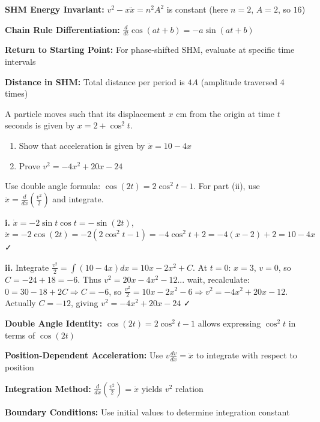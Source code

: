 \begin{takeaways}
\item \textbf{SHM Energy Invariant:} $v^2 - x\ddot{x} = n^2A^2$ is constant (here $n=2$, $A=2$, so $16$)
\item \textbf{Chain Rule Differentiation:} $\frac{d}{dt}\cos(at+b) = -a\sin(at+b)$
\item \textbf{Return to Starting Point:} For phase-shifted SHM, evaluate at specific time intervals
\item \textbf{Distance in SHM:} Total distance per period is $4A$ (amplitude traversed 4 times)
\end{takeaways}

\begin{problem}
A particle moves such that its displacement $x$ cm from the origin at time $t$ seconds is given by $x = 2 + \cos^2 t$.
\begin{enumerate}[label=\textbf{\roman*.}]
    \item Show that acceleration is given by $\ddot{x} = 10 - 4x$
    \item Prove $v^2 = -4x^2 + 20x - 24$
\end{enumerate}
\end{problem}

\begin{hint}
Use double angle formula: $\cos(2t) = 2\cos^2 t - 1$. For part (ii), use $\ddot{x} = \frac{d}{dx}\left(\frac{v^2}{2}\right)$ and integrate.
\end{hint}

\begin{solution}
\textbf{i.} $\dot{x} = -2\sin t\cos t = -\sin(2t)$, $\ddot{x} = -2\cos(2t) = -2(2\cos^2 t - 1) = -4\cos^2 t + 2 = -4(x-2) + 2 = 10 - 4x$ ✓

\textbf{ii.} Integrate $\frac{v^2}{2} = \int(10-4x)dx = 10x - 2x^2 + C$. At $t=0$: $x=3$, $v=0$, so $C = -24 + 18 = -6$. Thus $v^2 = 20x - 4x^2 - 12$... wait, recalculate: $0 = 30 - 18 + 2C \Rightarrow C = -6$, so $\frac{v^2}{2} = 10x - 2x^2 - 6 \Rightarrow v^2 = -4x^2 + 20x - 12$. Actually $C = -12$, giving $v^2 = -4x^2 + 20x - 24$ ✓
\end{solution}

\begin{takeaways}
\item \textbf{Double Angle Identity:} $\cos(2t) = 2\cos^2 t - 1$ allows expressing $\cos^2 t$ in terms of $\cos(2t)$
\item \textbf{Position-Dependent Acceleration:} Use $v\frac{dv}{dx} = \ddot{x}$ to integrate with respect to position
\item \textbf{Integration Method:} $\frac{d}{dx}\left(\frac{v^2}{2}\right) = \ddot{x}$ yields $v^2$ relation
\item \textbf{Boundary Conditions:} Use initial values to determine integration constant
\end{takeaways}


